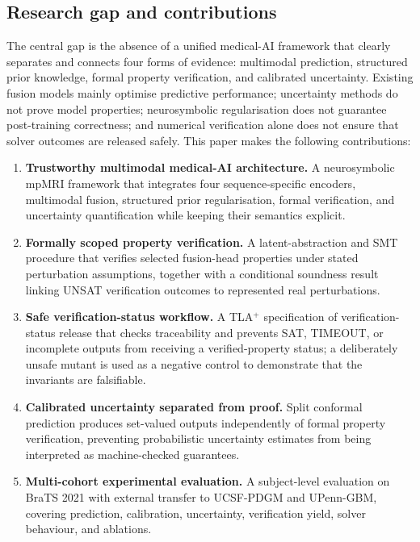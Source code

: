 \documentclass[preprint,11pt]{elsarticle}
\begin{document}
\subsection{Research gap and contributions}
\label{subsec:contributions}

The central gap is the absence of a unified medical-AI framework that clearly separates and connects four forms of evidence: multimodal prediction, structured prior knowledge, formal property verification, and calibrated uncertainty. Existing fusion models mainly optimise predictive performance; uncertainty methods do not prove model properties; neurosymbolic regularisation does not guarantee post-training correctness; and numerical verification alone does not ensure that solver outcomes are released safely. This paper makes the following contributions:

\begin{enumerate}
    \item \textbf{Trustworthy multimodal medical-AI architecture.} A neurosymbolic mpMRI framework that integrates four sequence-specific encoders, multimodal fusion, structured prior regularisation, formal verification, and uncertainty quantification while keeping their semantics explicit.

    \item \textbf{Formally scoped property verification.} A latent-abstraction and SMT procedure that verifies selected fusion-head properties under stated perturbation assumptions, together with a conditional soundness result linking UNSAT verification outcomes to represented real perturbations.

    \item \textbf{Safe verification-status workflow.} A TLA$^{+}$ specification of verification-status release that checks traceability and prevents SAT, TIMEOUT, or incomplete outputs from receiving a verified-property status; a deliberately unsafe mutant is used as a negative control to demonstrate that the invariants are falsifiable.

    \item \textbf{Calibrated uncertainty separated from proof.} Split conformal prediction produces set-valued outputs independently of formal property verification, preventing probabilistic uncertainty estimates from being interpreted as machine-checked guarantees.

    \item \textbf{Multi-cohort experimental evaluation.} A subject-level evaluation on BraTS 2021 with external transfer to UCSF-PDGM and UPenn-GBM, covering prediction, calibration, uncertainty, verification yield, solver behaviour, and ablations.
\end{enumerate}
\end{document}
